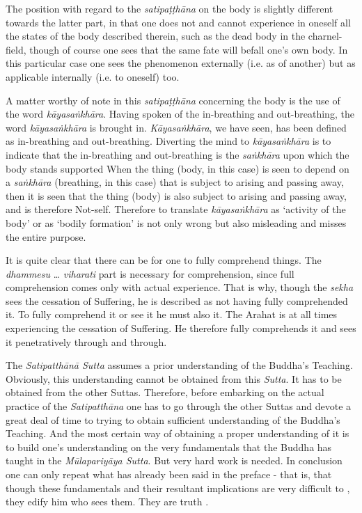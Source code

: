 The position with regard to the \emph{satipaṭṭhāna} on the body is slightly different towards the latter part, in that one does not and cannot experience in oneself all the states of the body described therein, such as the dead body in the charnel-field, though of course one sees that the same fate will befall one's own body. In this particular case one sees the phenomenon externally (i.e. as of another) but as applicable internally (i.e. to oneself) too.

A matter worthy of note in this \emph{satipaṭṭhāna} concerning the body is the use of the word \emph{kāyasaṅkhāra}. Having spoken of the in-breathing and out-breathing, the word \emph{kāyasaṅkhāra} is brought in. \emph{Kāyasaṅkhāra}, we have seen, has been defined as in-breathing and out-breathing. Diverting the mind to \emph{kāyasaṅkhāra} is to indicate that the in-breathing and out-breathing is the \emph{saṅkhāra} upon which the body stands supported When the thing (body, in this case) is seen to depend on a \emph{saṅkhāra} (breathing, in this case) that is subject to arising and passing away, then it is seen that the thing (body) is also subject to arising and passing away, and is therefore Not-self. Therefore to translate \emph{kāyasaṅkhāra} as `activity of the body' or as `bodily formation' is not only wrong but also misleading and misses the entire purpose.

It is quite clear that there can be  for one to fully comprehend things. The \emph{dhammesu} \ldots\hspace{0pt} \emph{viharati} part is necessary for  comprehension, since full comprehension comes only with actual experience. That is why, though the \emph{sekha} sees the cessation of Suffering, he is described as not having fully comprehended it. To fully comprehend it or  see it  he must also  it. The Arahat is at all times experiencing the cessation of Suffering. He therefore fully comprehends it and sees it penetratively through and through.

\protect\hypertarget{truth-for-him}{}{}The \emph{Satipatthānā Sutta} assumes a prior understanding of the Buddha's Teaching. Obviously, this understanding cannot be obtained from this \emph{Sutta}. It has to be obtained from the other Suttas. Therefore, before embarking on the actual practice of the \emph{Satipatthāna} one has to go through the other Suttas and devote a great deal of time to trying to obtain sufficient understanding of the Buddha's Teaching. And the most certain way of obtaining a proper understanding of it is to build one's understanding on the very fundamentals that the Buddha has taught in the \emph{Mūlapariyāya Sutta}. But very hard work is needed. In conclusion one can only repeat what has already been said in the preface - that is, that though these fundamentals and their resultant implications are very difficult to , they edify him who sees them. They are truth .
